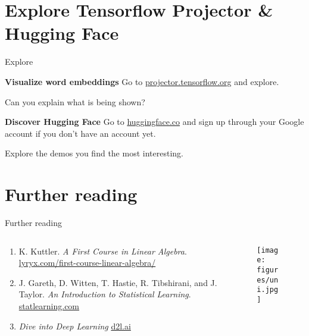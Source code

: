 \documentclass[UKenglish]{beamer}
\begin{document}
\section{Explore Tensorflow Projector \& Hugging Face}
\SectionPage

\begin{frame}{Explore}
   \begin{alertblock}{\textbf{Visualize word embeddings}}
       Go to \url{projector.tensorflow.org} and explore. \par \vspace{5pt}
       Can you explain what is being shown?
   \end{alertblock}

   \begin{alertblock}{\textbf{Discover Hugging Face}}
       Go to  \url{huggingface.co} and sign up through your Google account if you don't have an account yet. \par \vspace{5pt}
       Explore the demos you find the most interesting. 
   \end{alertblock}
   
\end{frame}

\section{Further reading}
\begin{frame}{Further reading}
    \begin{columns}[onlytextwidth]
        \begin{column}{0.55\textwidth}
        \vspace{-10pt}
            \vspace{10pt}
            \begin{enumerate}
                \item K. Kuttler. \emph{A First Course in Linear Algebra}. \url{lyryx.com/first-course-linear-algebra/}

                \item J. Gareth, D. Witten, T. Hastie, R. Tibshirani, and J. Taylor. \emph{An Introduction to Statistical Learning}. \url{statlearning.com}

                \item \emph{Dive into Deep Learning} \url{d2l.ai}
            \end{enumerate}
        \end{column}

        \begin{column}{0.45\textwidth}
        \vspace{-10pt}
            \begin{figure}
            \texttt{[image: figures/uni.jpg]}
            \end{figure}
        \end{column}
        
        
    \end{columns}
\end{frame}
\end{document}
